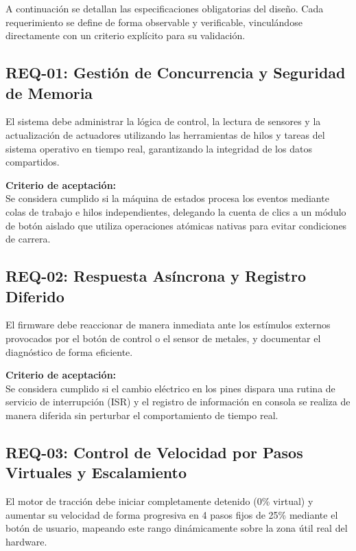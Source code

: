 \documentclass[12pt, letterpaper]{article}
\begin{document}
A continuación se detallan las especificaciones obligatorias del diseño. Cada requerimiento se define de forma observable y verificable, vinculándose directamente con un criterio explícito para su validación.

\subsection{REQ-01: Gestión de Concurrencia y Seguridad de Memoria}
El sistema debe administrar la lógica de control, la lectura de sensores y la actualización de actuadores utilizando las herramientas de hilos y tareas del sistema operativo en tiempo real, garantizando la integridad de los datos compartidos.

\vspace{0.5cm}

\noindent \textbf{Criterio de aceptación:} \\
Se considera cumplido si la máquina de estados procesa los eventos mediante colas de trabajo e hilos independientes, delegando la cuenta de clics a un módulo de botón aislado que utiliza operaciones atómicas nativas para evitar condiciones de carrera.

\subsection{REQ-02: Respuesta Asíncrona y Registro Diferido}
El firmware debe reaccionar de manera inmediata ante los estímulos externos provocados por el botón de control o el sensor de metales, y documentar el diagnóstico de forma eficiente.

\vspace{0.5cm}

\noindent \textbf{Criterio de aceptación:} \\
Se considera cumplido si el cambio eléctrico en los pines dispara una rutina de servicio de interrupción (ISR) y el registro de información en consola se realiza de manera diferida sin perturbar el comportamiento de tiempo real.

\subsection{REQ-03: Control de Velocidad por Pasos Virtuales y Escalamiento}
El motor de tracción debe iniciar completamente detenido (0\% virtual) y aumentar su velocidad de forma progresiva en 4 pasos fijos de 25\% mediante el botón de usuario, mapeando este rango dinámicamente sobre la zona útil real del hardware.
\end{document}
